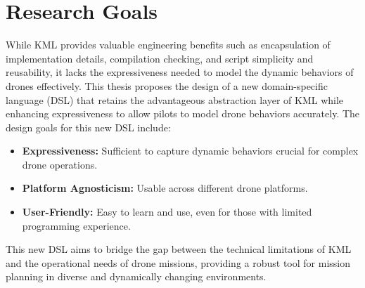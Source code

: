 \section{Research Goals}
While KML provides valuable engineering benefits such as encapsulation of implementation details, compilation checking, and script simplicity and reusability, it lacks the expressiveness needed to model the dynamic behaviors of drones effectively. This thesis proposes the design of a new domain-specific language (DSL) that retains the advantageous abstraction layer of KML while enhancing expressiveness to allow pilots to model drone behaviors accurately. The design goals for this new DSL include:
\begin{itemize}
    \item \textbf{Expressiveness:} Sufficient to capture dynamic behaviors crucial for complex drone operations.
    \item \textbf{Platform Agnosticism:} Usable across different drone platforms.
    \item \textbf{User-Friendly:} Easy to learn and use, even for those with limited programming experience.
\end{itemize}

This new DSL aims to bridge the gap between the technical limitations of KML and the operational needs of drone missions, providing a robust tool for mission planning in diverse and dynamically changing environments.
